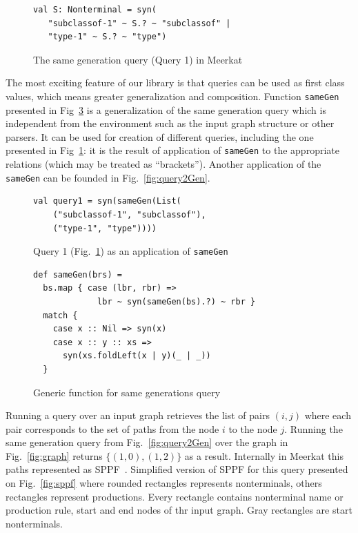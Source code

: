 \begin{figure}[h]
\begin{lstlisting}
val S: Nonterminal = syn(
   "subclassof-1" ~ S.? ~ "subclassof" |
   "type-1" ~ S.? ~ "type")
\end{lstlisting}
\caption{The same generation query (Query 1) in Meerkat}
\label{fig:query1Meerkat}
\end{figure}


The most exciting feature of our library is that queries can be used as first class values, which means greater generalization and composition. 
Function \lstinline{sameGen} presented in Fig~\ref{fig:gen} is a generalization of the same generation query which is independent from the environment such as the input graph structure or other parsers.
It can be used for creation of different queries, including the one presented in Fig~\ref{fig:query1Meerkat}: it is the result of application of \lstinline{sameGen} to the appropriate relations (which may be treated  as ``brackets'').
Another application of the \lstinline{sameGen} can be founded in Fig.~\ref{fig:query2Gen}.

\begin{figure}[h]
\begin{lstlisting}
val query1 = syn(sameGen(List(
    ("subclassof-1", "subclassof"),
    ("type-1", "type"))))
\end{lstlisting}
\caption{Query 1 (Fig.~\ref{fig:query1Meerkat}) as an application of \lstinline{sameGen}}
\label{fig:query1Gen}
\end{figure}

\begin{figure}[h]
\begin{lstlisting}
def sameGen(brs) =
  bs.map { case (lbr, rbr) => 
             lbr ~ syn(sameGen(bs).?) ~ rbr } 
  match {
    case x :: Nil => syn(x)
    case x :: y :: xs => 
      syn(xs.foldLeft(x | y)(_ | _))
  }
\end{lstlisting}
\caption{Generic function for same generations query}
\label{fig:gen}
\end{figure}

Running a query over an input graph retrieves the list of pairs $(i, j)$ where each pair corresponds to the set of paths from the node $i$ to the node $j$. 
Running the same generation query from Fig.~\ref{fig:query2Gen} over the graph in Fig.~\ref{fig:graph} returns  $\{(1,0), (1,2)\}$ as a result. 
Internally in Meerkat this paths represented as SPPF~\cite{SPPF}. 
Simplified version of SPPF for this query presented on Fig.~\ref{fig:sppf} where rounded rectangles represents nonterminals, others rectangles represent productions. 
Every rectangle contains  nonterminal name or production rule, start and end nodes of thr input graph. 
Gray rectangles are start nonterminals.

